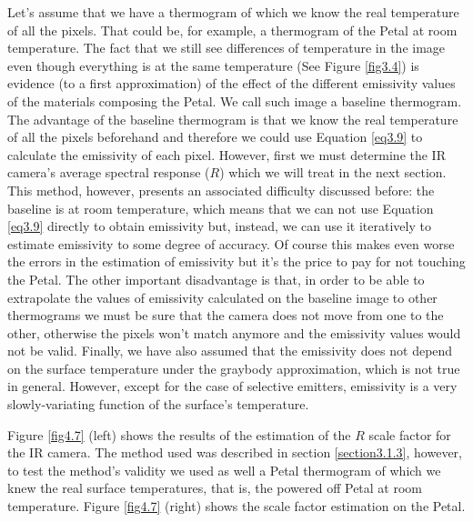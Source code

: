 		Let's assume that we have a thermogram of which we know the real temperature of all the pixels. That could be, for example, a thermogram of the Petal at room temperature. The fact that we still see differences of temperature in the image even though everything is at the same temperature (See Figure \ref{fig3.4}) is evidence (to a first approximation) of the effect of the different emissivity values of the materials composing the Petal. We call such image a baseline thermogram. The advantage of the baseline thermogram is that we know the real temperature of all the pixels beforehand and therefore we could use Equation \ref{eq3.9} to calculate the emissivity of each pixel. However, first we must determine the IR camera’s average spectral response ($R$) which we will treat in the next section. 
		This method, however, presents an associated difficulty discussed before: the baseline is at room temperature, which means that we can not use Equation \ref{eq3.9} directly to obtain emissivity but, instead, we can use it iteratively to estimate emissivity to some degree of accuracy. Of course this makes even worse the errors in the estimation of emissivity but it's the price to pay for not touching the Petal. The other important disadvantage is that, in order to be able to extrapolate the values of emissivity calculated on the baseline image to other thermograms we must be sure that the camera does not move from one to the other, otherwise the pixels won't match anymore and the emissivity values would not be valid.
		Finally, we have also assumed that the emissivity does not depend on the surface temperature under the graybody approximation, which is not true in general. However, except for the case of selective emitters, emissivity is a very slowly-variating function of the surface's temperature.
		
		\bigskip
		Figure \ref{fig4.7} (left) shows the results of the estimation of the $R$ scale factor for the IR camera. The method used was described in section \ref{section3.1.3}, however, to test the method's validity we used as well a Petal thermogram of which we knew the real surface temperatures, that is, the powered off Petal at room temperature. Figure \ref{fig4.7} (right) shows the scale factor estimation on the Petal.
		
